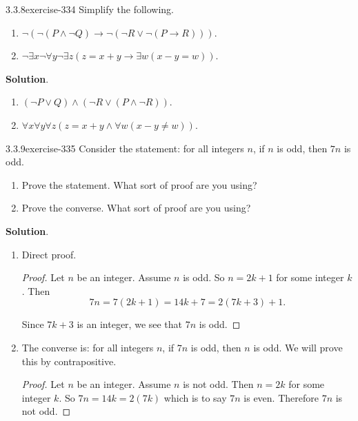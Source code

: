 \documentclass[twoside,11pt,]{book}
\numberwithin{equation}{chapter}
\newcommand{\imp}{\rightarrow}
\begin{document}
\begin{divisionsolution}{3.3.8}{}{exercise-334}%
\hypertarget{p-4286}{}%
Simplify the following.\leavevmode%
\begin{enumerate}[label=(\alph*)]
\item\hypertarget{li-2184}{}\(\neg (\neg (P \wedge \neg Q) \imp \neg(\neg R \vee \neg(P \imp R)))\).%
\item\hypertarget{li-2185}{}\(\neg \exists x \neg \forall y \neg \exists z (z = x + y \imp \exists w (x - y = w))\).%
\end{enumerate}
%
\par\smallskip%
\noindent\textbf{Solution}.\quad%
\hypertarget{p-4287}{}%
\leavevmode%
\begin{enumerate}[label=(\alph*)]
\item\hypertarget{li-2186}{}\((\neg P \vee Q) \wedge (\neg R \vee (P \wedge \neg R))\).%
\item\hypertarget{li-2187}{}\(\forall x \forall y \forall z (z = x+y \wedge \forall w (x-y \ne w))\).%
\end{enumerate}
%
\end{divisionsolution}%
\begin{divisionsolution}{3.3.9}{}{exercise-335}%
\hypertarget{p-4288}{}%
Consider the statement: for all integers \(n\), if \(n\) is odd, then \(7n\) is odd.\leavevmode%
\begin{enumerate}[label=(\alph*)]
\item\hypertarget{li-2188}{}\hypertarget{p-4289}{}%
Prove the statement. What sort of proof are you using?%
\item\hypertarget{li-2189}{}\hypertarget{p-4290}{}%
Prove the converse. What sort of proof are you using?%
\end{enumerate}
%
\par\smallskip%
\noindent\textbf{Solution}.\quad%
\hypertarget{p-4291}{}%
\leavevmode%
\begin{enumerate}[label=(\alph*)]
\item\hypertarget{li-2190}{}\hypertarget{p-4292}{}%
Direct proof. \begin{proof}{}
\hypertarget{p-4293}{}%
Let \(n\) be an integer. Assume \(n\) is odd. So \(n = 2k+1\) for some integer \(k\). Then%
\begin{equation*}
7n = 7(2k+1) = 14k + 7 = 2(7k +3) + 1\text{.}
\end{equation*}
%
\par
\hypertarget{p-4294}{}%
Since \(7k + 3\) is an integer, we see that \(7n\) is odd.%
\end{proof}
%
\item\hypertarget{li-2191}{}\hypertarget{p-4295}{}%
The converse is: for all integers \(n\), if \(7n\) is odd, then \(n\) is odd. We will prove this by contrapositive. \begin{proof}{}
\hypertarget{p-4296}{}%
Let \(n\) be an integer. Assume \(n\) is not odd. Then \(n = 2k\) for some integer \(k\). So \(7n = 14k = 2(7k)\) which is to say \(7n\) is even. Therefore \(7n\) is not odd.%
\end{proof}
%
\end{enumerate}
%
\end{divisionsolution}%
\end{document}
